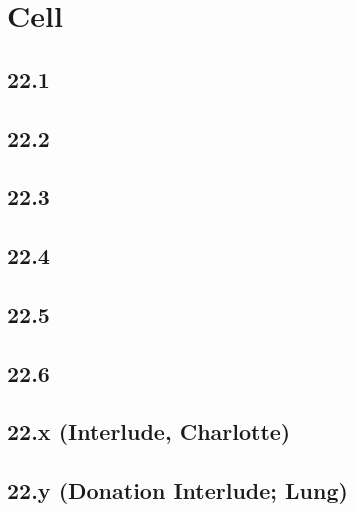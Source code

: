 \part{Cell}
 \chapter{22.1}
 \chapter{22.2}
 \chapter{22.3}
 \chapter{22.4}
 \chapter{22.5}
 \chapter{22.6}
 \chapter{22.x (Interlude, Charlotte)}
 \chapter{22.y (Donation Interlude; Lung)}









